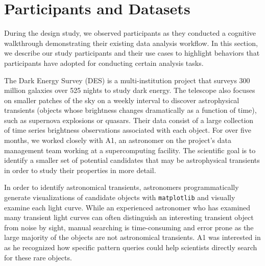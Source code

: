 \section{Participants and Datasets}
During the design study, we observed participants as they conducted a cognitive walkthrough demonstrating their existing data analysis workflow. In this section, we describe our study participants and their use cases to highlight behaviors that participants have adopted for conducting certain analysis tasks.
\par\noindent{} The Dark Energy Survey (DES) is a multi-institution project that surveys 300 million galaxies over 525 nights to study dark energy. The telescope also focuses on smaller patches of the sky on a weekly interval to discover astrophysical transients (objects whose brightness changes dramatically as a function of time), such as supernova explosions or quasars. Their data consist of a large collection of time series brightness observations associated with each object. For over five months, we worked closely with A1, an astronomer on the project's data management team working at a supercomputing facility. The scientific goal is to identify a smaller set of potential candidates that may be astrophysical transients in order to study their properties in more detail. 
\par In order to identify astronomical transients, astronomers programmatically generate visualizations of candidate objects with \texttt{matplotlib} and visually examine each light curve. While an experienced astronomer who has examined many transient light curves can often distinguish an interesting transient object from noise by sight, manual searching is time-consuming and error prone as the large majority of the objects are not astronomical transients. A1 was interested in \zv as he recognized how specific pattern queries could help scientists directly search for these rare objects.
